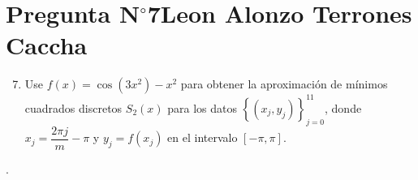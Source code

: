 \section{Pregunta N$^{\circ}$7\qquad Leon Alonzo Terrones Caccha}

\begin{frame}
    \begin{enumerate}\setcounter{enumi}{6}
        \item

              Use
              \begin{math}
                  f\left(x\right)=
                  \cos\left(3x^{2}\right)-
                  x^{2}
              \end{math}
              para obtener la aproximación de mínimos cuadrados
              discretos $S_{2}\left(x\right)$ para los datos
              \begin{math}
                  \left\{
                  \left(x_{j},y_{j}\right)
                  \right\}_{j=0}^{11}
              \end{math},
              donde $x_{j}=\dfrac{2\pi j}{m}-\pi$ y
              $y_{j}=f\left(x_{j}\right)$ en el intervalo
              $\left[-\pi,\pi\right]$.
    \end{enumerate}

    \begin{solution}
        .
    \end{solution}
\end{frame}
